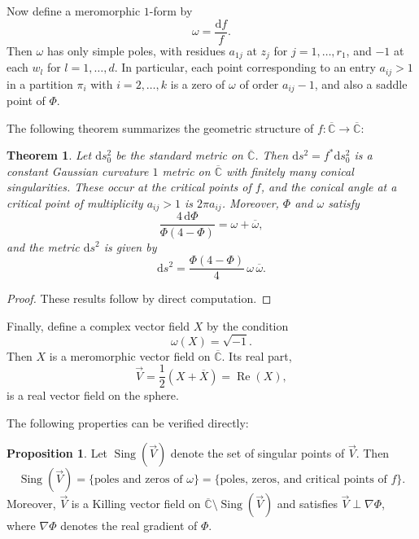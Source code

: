 \documentclass[microtype]{gtpart}     %
\newtheorem{theorem}{Theorem}[section]    %
\theoremstyle{definition}
\newtheorem{prop}{Proposition}[section]
\begin{document}
Now define a meromorphic $1$-form by
\[
\omega = \frac{\mathrm{d}f}{f}.
\]
Then $\omega$ has only simple poles, with residues $a_{1j}$ at $z_j$ for $j = 1, \ldots, r_1$, and $-1$ at each $w_l$ for $l = 1, \ldots, d$. In particular, each point corresponding to an entry $a_{ij} > 1$ in a partition $\pi_i$ with $i = 2, \ldots, k$ is a zero of $\omega$ of order $a_{ij} - 1$, and also a saddle point of $\Phi$.

The following theorem summarizes the geometric structure of $f: \overline{\mathbb{C}} \to \overline{\mathbb{C}}$:

\begin{theorem}\label{Thm3.1}
Let $\mathrm{d}s^{2}_{0}$ be the standard metric on $\overline{\mathbb{C}}$. Then $\mathrm{d}s^{2} = f^*\mathrm{d}s^{2}_{0}$ is a constant Gaussian curvature $1$ metric on $\overline{\mathbb{C}}$ with finitely many conical singularities. These occur at the critical points of $f$, and the conical angle at a critical point of multiplicity $a_{ij} > 1$ is $2\pi a_{ij}$. Moreover, $\Phi$ and $\omega$ satisfy
\begin{equation}\label{E-1}
\frac{4\,\mathrm{d}\Phi}{\Phi(4 - \Phi)} = \omega + \overline{\omega},
\end{equation}
and the metric $\mathrm{d}s^{2}$ is given by
\[
\mathrm{d}s^{2} = \frac{\Phi(4 - \Phi)}{4} \, \omega \, \overline{\omega}.
\]
\end{theorem}

\begin{proof}
These results follow by direct computation.
\end{proof}

Finally, define a complex vector field $X$ by the condition
\[
\omega(X) = \sqrt{-1}.
\]
Then $X$ is a meromorphic vector field on $\overline{\mathbb{C}}$. Its real part,
\[
\vec{V} = \frac{1}{2}(X + \overline{X}) = \operatorname{Re}(X),
\]
is a real vector field on the sphere.




The following properties can be verified directly:

\begin{prop}\label{Pro-2-2}
Let $\operatorname{Sing}(\vec{V})$ denote the set of singular points of $\vec{V}$. Then
\[
\operatorname{Sing}(\vec{V}) = \{\text{poles and zeros of } \omega\} = \{\text{poles, zeros, and critical points of } f\}.
\]
Moreover, $\vec{V}$ is a Killing vector field on $\overline{\mathbb{C}}\setminus \operatorname{Sing}(\vec{V})$ and satisfies $\vec{V} \perp \nabla \Phi$, where $\nabla \Phi$ denotes the real gradient of $\Phi$.
\end{prop}
\end{document}
